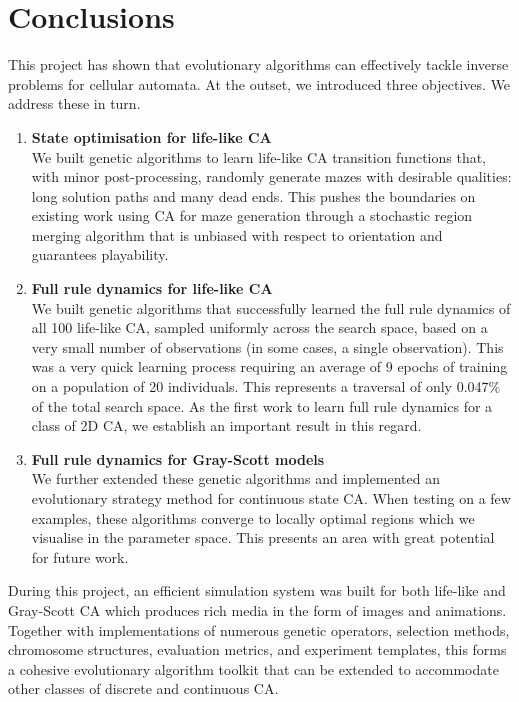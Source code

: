 \chapter{Conclusions}

This project has shown that evolutionary algorithms can effectively tackle inverse problems for cellular automata. At the outset, we introduced three objectives. We address these in turn.
\begin{enumerate}
    \item \textbf{State optimisation for life-like CA}\\
    We built genetic algorithms to learn life-like CA transition functions that, with minor post-processing, randomly generate mazes with desirable qualities: long solution paths and many dead ends. This pushes the boundaries on existing work using CA for maze generation\cite{adams2017procedural, adams2018evolving} through a stochastic region merging algorithm that is unbiased with respect to orientation and guarantees playability.
    \item \textbf{Full rule dynamics for life-like CA}\\
    We built genetic algorithms that successfully learned the full rule dynamics of all 100 life-like CA, sampled uniformly across the search space, based on a very small number of observations (in some cases, a single observation). This was a very quick learning process requiring an average of 9 epochs of training on a population of 20 individuals. This represents a traversal of only 0.047\% of the total search space. As the first work to learn full rule dynamics for a class of 2D CA, we establish an important result in this regard.
    \item \textbf{Full rule dynamics for Gray-Scott models}\\
    We further extended these genetic algorithms and implemented an evolutionary strategy method for continuous state CA. When testing on a few examples, these algorithms converge to locally optimal regions which we visualise in the parameter space. This presents an area with great potential for future work.
\end{enumerate}

During this project, an efficient simulation system was built for both life-like and Gray-Scott CA which produces rich media in the form of images and animations. Together with implementations of numerous genetic operators, selection methods, chromosome structures, evaluation metrics, and experiment templates, this forms a cohesive evolutionary algorithm toolkit that can be extended to accommodate other classes of discrete and continuous CA.

